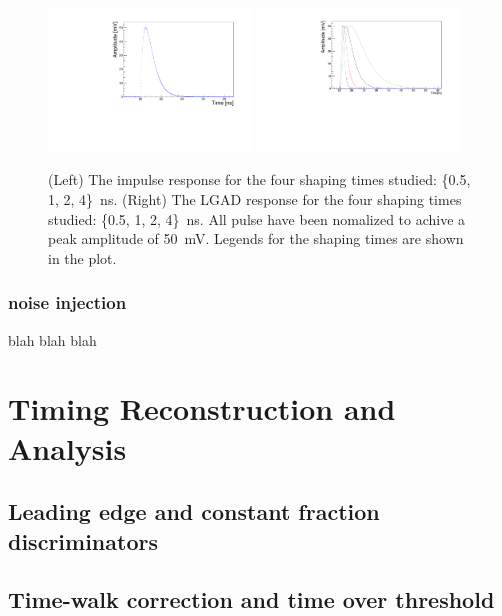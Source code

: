 \documentclass[preprint,1p]{elsarticle}
\begin{document}
\begin{figure}[htbp]
  \centering
  \includegraphics[width=0.48\textwidth]{figs/impulse_response.pdf} \hfill
  \includegraphics[width=0.48\textwidth]{figs/lgad_all_shaping_time_noiseless.pdf}
  \caption{(Left) The impulse response for the four shaping times studied: \{0.5, 1, 2, 4\}~\si{ns}.
  (Right) The LGAD response for the four shaping times studied: \{0.5, 1, 2, 4\}~\si{ns}. All pulse have been nomalized
  to achive a peak amplitude of 50~\si{mV}. Legends for the shaping times are shown in the plot.}
  \label{fig:ir_and_lgad}
\end{figure}


\subsubsection{noise injection}\label{sec:noise_simulation}
blah blah blah
\section{Timing Reconstruction and Analysis}
\label{sec:timing_and_analysis}

\subsection{Leading edge and constant fraction discriminators}
\label{sec:le_and_cfd}

\subsection{Time-walk correction and time over threshold}
\label{sec:tw_and_tot}
\end{document}
